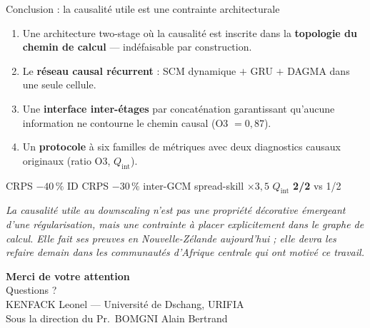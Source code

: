 \documentclass[aspectratio=169,10pt]{beamer}
\newcommand{\tgood}[1]{\textcolor{green!40!black}{\textbf{#1}}}
\begin{document}
\begin{frame}{Conclusion : la causalité utile est une contrainte architecturale}
  \small
  \begin{enumerate}
    \item[\textbf{C1}] Une architecture two-stage où la causalité est inscrite dans la
      \textbf{topologie du chemin de calcul} --- indéfaisable par construction.
    \item[\textbf{C2}] Le \textbf{réseau causal récurrent} : SCM dynamique $+$ GRU $+$
      DAGMA dans une seule cellule.
    \item[\textbf{C3}] Une \textbf{interface inter-étages} par concaténation garantissant
      qu'aucune information ne contourne le chemin causal (O3 $= 0{,}87$).
    \item[\textbf{C4}] Un \textbf{protocole} à six familles de métriques avec deux
      diagnostics causaux originaux (ratio O3, $Q_{\mathrm{int}}$).
  \end{enumerate}
  \vspace{0.15cm}
  \centering
  CRPS \tgood{$-40\,\%$} ID \quad CRPS \tgood{$-30\,\%$} inter-GCM \quad
  spread-skill \tgood{$\times 3{,}5$} \quad $Q_{\mathrm{int}}$ \tgood{2/2} vs 1/2
  \vspace{0.2cm}
  \begin{block}{}
    \centering\small\itshape La causalité utile au downscaling n'est pas une propriété
    décorative émergeant d'une régularisation, mais une contrainte à placer explicitement
    dans le graphe de calcul. Elle fait ses preuves en Nouvelle-Zélande aujourd'hui ;
    elle devra les refaire demain dans les communautés d'Afrique centrale qui ont motivé
    ce travail.
  \end{block}
\end{frame}

\begin{frame}[plain]
  \vfill
  \centering
  {\Huge\bfseries\color{uridarkblue} Merci de votre attention}\\[0.6cm]
  {\large Questions ?}\\[1.0cm]
  {\footnotesize KENFACK Leonel --- Université de Dschang, URIFIA\\
  Sous la direction du Pr.~BOMGNI Alain Bertrand}
  \vfill
\end{frame}

\end{document}

